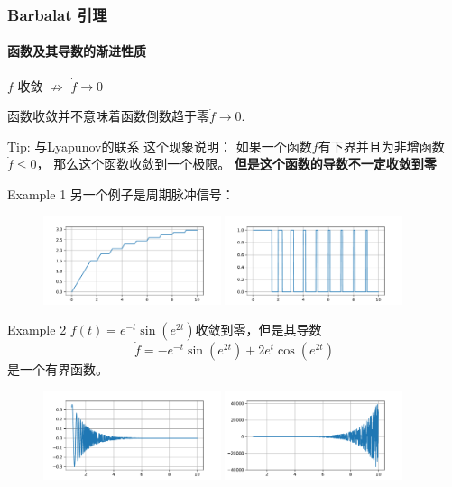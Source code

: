 \begin{frame}
  \frametitle{Barbalat 引理}
  \framesubtitle{函数及其导数的渐进性质}

  $f$ 收敛
  $\nRightarrow$
  $\dot{f}\to 0 $

  函数收敛并不意味着函数倒数趋于零$\dot{f}\to 0$.

  \begin{block}{Tip: 与Lyapunov的联系}
    这个现象说明：
    如果一个函数$f$有下界并且为非增函数$\dot{f}\leq 0$，
    那么这个函数收敛到一个极限。
    \textbf{但是这个函数的导数不一定收敛到零}
  \end{block}

  \begin{block}{Example 1}
    另一个例子是周期脉冲信号：

    \begin{figure}
      \centering
      \includegraphics[height=2.6cm]{figure/barbalat_f4.pdf}
      \includegraphics[height=2.6cm]{figure/barbalat_f4d.pdf}
    \end{figure}
  \end{block}
\end{frame}


\begin{frame}
  \begin{block}{Example 2}
    $f(t)=e^{-t}\sin (e^{2t})$收敛到零，但是其导数
    \[
      \dot{f}=-e^{-t}\sin(e^{2t}) + 2 e^{t} \cos(e^{2t})
    \]
    是一个有界函数。

    \begin{figure}
      \centering
      \includegraphics[height=2.6cm]{figure/barbalat_f3.pdf}
      \includegraphics[height=2.6cm]{figure/barbalat_f3d.pdf}
    \end{figure}
  \end{block}
\end{frame}

